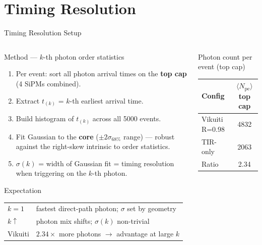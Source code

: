 \documentclass[aspectratio=169,10pt]{beamer}
\begin{document}
\section{Timing Resolution}

\begin{frame}{Timing Resolution Setup}

\begin{columns}[T]
  \begin{column}{0.56\textwidth}
  \begin{block}{Method — $k$-th photon order statistics}
    \begin{enumerate}\setlength\itemsep{0.25em}
      \item Per event: sort all photon arrival times on the \textbf{top cap}
            (4 SiPMs combined).
      \item Extract $t_{(k)}$ = $k$-th earliest arrival time.
      \item Build histogram of $t_{(k)}$ across all 5000 events.
      \item Fit Gaussian to the \textbf{core} ($\pm2\sigma_{68\%}$ range) —
            robust against the right-skew intrinsic to order statistics.
      \item $\sigma(k)$ = width of Gaussian fit = timing resolution
            when triggering on the $k$-th photon.
    \end{enumerate}
  \end{block}

  \vspace{0.4em}
  \begin{block}{Expectation}
  \small
  \begin{tabular}{@{}l@{$\;\Rightarrow\;$}l@{}}
    $k=1$       & fastest direct-path photon; $\sigma$ set by geometry \\
    $k\uparrow$ & photon mix shifts; $\sigma(k)$ non-trivial \\
    Vikuiti     & $2.34\times$ more photons $\to$ advantage at large $k$ \\
  \end{tabular}
  \end{block}
  \end{column}

  \begin{column}{0.42\textwidth}
  \begin{block}{Photon count per event (top cap)}
    \renewcommand{\arraystretch}{1.2}
    \begin{tabular}{@{}lS[table-format=4.0]@{}}
      \toprule
      Config & {$\langle N_\text{pe}\rangle$ top cap} \\
      \midrule
      Vikuiti R=0.98 & 4832 \\
      TIR-only       & 2063 \\
      \midrule
      Ratio & 2.34 \\
      \bottomrule
    \end{tabular}


\end{block}
\end{column}
\end{columns}
\end{frame}
\end{document}
